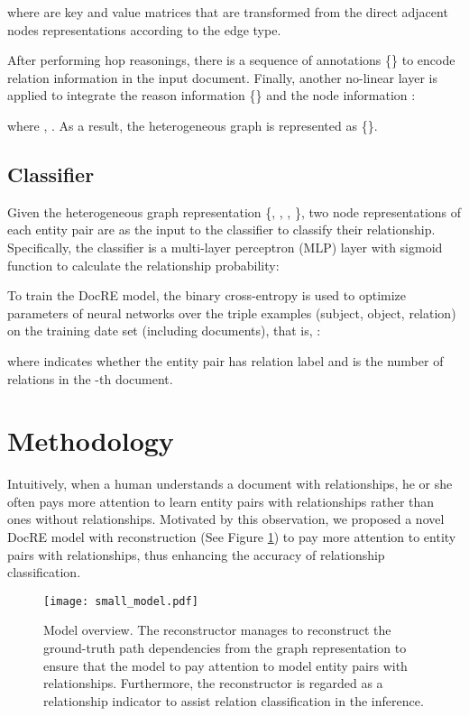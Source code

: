 \documentclass[letterpaper]{article} \usepackage{aaai21}  \usepackage{times}  \usepackage{helvet} \usepackage{courier}  \usepackage[hyphens]{url}  \usepackage{graphicx} \urlstyle{rm} \def\UrlFont{\rm}  \usepackage{natbib}  \usepackage{caption} \frenchspacing  \setlength{\pdfpagewidth}{8.5in}  \setlength{\pdfpageheight}{11in}  \usepackage{amsmath}
\begin{document}
where  are key and value matrices that are transformed from the direct adjacent nodes representations  according to the edge type.


After performing  hop reasonings, there is a sequence of annotations \{\} to encode relation information in the input document.
Finally, another no-linear layer is applied to integrate the reason information \{\} and the node information :

where ,
.
As a result, the heterogeneous graph  is represented as \{\}.



\subsection{Classifier}
Given the heterogeneous graph representation \{, , , \}, two node representations of each entity pair are as the input to the classifier to classify their relationship. 
Specifically, the classifier is a multi-layer perceptron (MLP) layer with sigmoid function to calculate the relationship probability:


To train the DocRE model, the binary cross-entropy is used to optimize parameters of neural networks over the triple examples (subject, object, relation) on the training date set (including  documents), that is, :  

where  indicates whether the entity pair has relation label  and  is the number of relations in the -th document. 



\section{Methodology}
Intuitively, when a human understands a document with relationships, he or she often pays more attention to learn entity pairs with relationships rather than ones without relationships.
Motivated by this observation, we proposed a novel DocRE model with reconstruction (See Figure \ref{fig1:model}) to pay more attention to entity pairs with relationships, thus enhancing the accuracy of relationship classification.
\begin{figure}[h]
\centering
\texttt{[image: small\_model.pdf]} \caption{Model overview. The reconstructor manages to reconstruct the ground-truth path dependencies from the graph representation to ensure that the model to pay attention to model entity pairs with relationships. Furthermore, the reconstructor is regarded as a relationship indicator to assist relation classification in the inference.
}
\label{fig1:model}
\end{figure}
\end{document}
